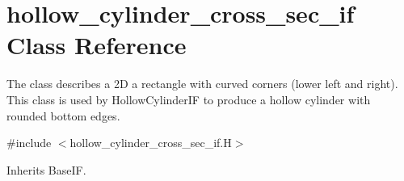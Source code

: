 \hypertarget{classhollow__cylinder__cross__sec__if}{}\section{hollow\+\_\+cylinder\+\_\+cross\+\_\+sec\+\_\+if Class Reference}
\label{classhollow__cylinder__cross__sec__if}


The class describes a 2D a rectangle with curved corners (lower left and right). This class is used by Hollow\+Cylinder\+IF to produce a hollow cylinder with rounded bottom edges.  




{\ttfamily \#include $<$hollow\+\_\+cylinder\+\_\+cross\+\_\+sec\+\_\+if.\+H$>$}



Inherits Base\+IF.

